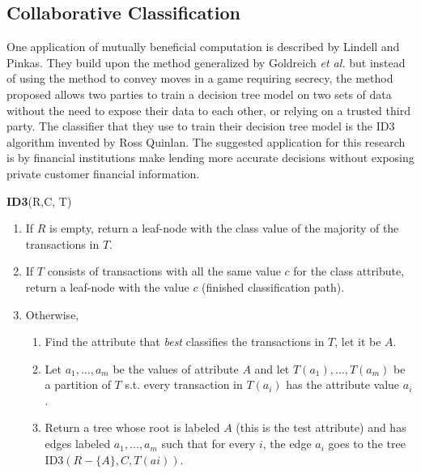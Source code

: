 \documentclass[]{article}
\begin{document}
	\subsection{Collaborative Classification}	
		
One application of mutually beneficial computation is described by Lindell and Pinkas. \cite{Lindell2000} 
They build upon the method generalized by Goldreich \emph{et al.} \cite{Goldreich1987}	
but instead of using the method to convey moves in a game requiring secrecy, the method proposed allows two parties to train a decision tree model on two sets of data without the need to expose their data to each other, or relying on a trusted third party. 
The classifier that they use to train their decision tree model is the ID3 algorithm invented by Ross Quinlan. \cite{Quinlan1986}
The suggested application for this research is by financial institutions make lending more accurate decisions without exposing private customer financial information.

\begingroup
\begin{framed}	
	\textbf{ID3}(R,C, T)
	\begin{enumerate}
		\item If $R$ is empty, return a leaf-node with the class value of the majority of the transactions in $T$.
		\item If $T$ consists of transactions with all the same value $c$ for the class attribute, return a leaf-node with the value $c$ (finished classification path). 
		\item Otherwise,
		{\small
		\begin{enumerate}
			\item Find the attribute that \emph{best} classifies the transactions in $T$, let it be $A$.
			\item Let $a_1,\ldots,a_m$ be the values of attribute $A$ and let $T(a_1),\ldots,T(a_m)$ be a partition of $T$ s.t. every transaction in $T(a_i)$ has the attribute value $a_i$.
			\item Return a tree whose root is labeled $A$ (this is the test attribute) and has edges labeled $a_1,\ldots,a_m$ such that for every $i$, the edge $a_i$ goes to the tree ID3$(R-\{A\},C,T(ai))$.
		\end{enumerate}}
	\end{enumerate}
\end{framed}
\vspace{-1.25em}
\vspace{1.5em}
\endgroup	
\end{document}

